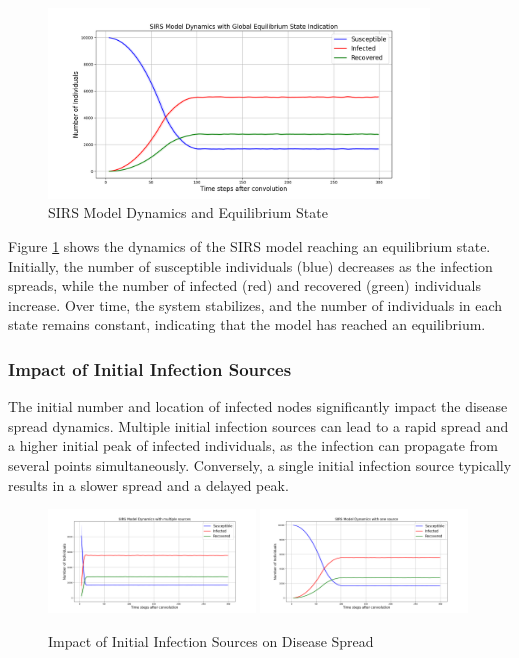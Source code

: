 \begin{figure}[H]
    \centering
    \includegraphics[width=0.9\textwidth]{equilibrium_state.png}
    \caption{SIRS Model Dynamics and Equilibrium State}
    \label{fig:equilibrium_state}
\end{figure}

\noindent
Figure \ref{fig:equilibrium_state} shows the dynamics of the SIRS model reaching an equilibrium state. Initially, the number of susceptible individuals (blue) decreases as the infection spreads, while the number of infected (red) and recovered (green) individuals increase. Over time, the system stabilizes, and the number of individuals in each state remains constant, indicating that the model has reached an equilibrium.

\subsubsection{Impact of Initial Infection Sources}
The initial number and location of infected nodes significantly impact the disease spread dynamics. Multiple initial infection sources can lead to a rapid spread and a higher initial peak of infected individuals, as the infection can propagate from several points simultaneously. Conversely, a single initial infection source typically results in a slower spread and a delayed peak.

\begin{figure}[H]
    \centering
    \includegraphics[width=0.49\textwidth]{multiple_sources.png}
    \includegraphics[width=0.49\textwidth]{one_source.png}
    \caption{Impact of Initial Infection Sources on Disease Spread}
    \label{fig:infection_sources_impact}
\end{figure}

